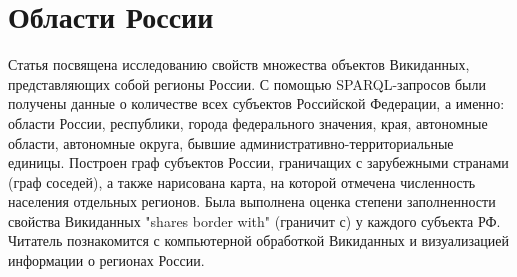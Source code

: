 \chapter{Области России}
\label{ch:oblast-of-Russia}
Статья посвящена исследованию свойств множества объектов Викиданных, 
представляющих собой регионы России. С помощью SPARQL-запросов были получены 
данные о количестве всех субъектов Российской Федерации, а именно: области России, 
республики, города федерального значения, края, автономные области, автономные округа, 
бывшие административно-территориальные единицы. Построен граф субъектов России, граничащих 
с зарубежными странами (граф соседей), а также нарисована карта, на которой отмечена численность 
населения отдельных регионов. Была выполнена оценка степени заполненности свойства Викиданных 
"shares border with" (граничит с) у каждого субъекта РФ. Читатель познакомится с компьютерной 
обработкой Викиданных и визуализацией информации о регионах России.

